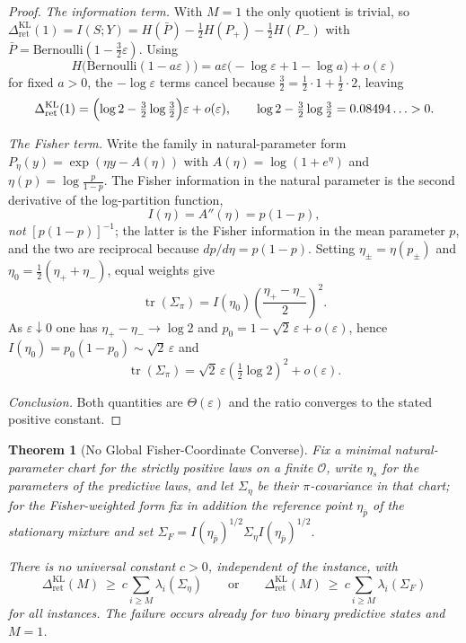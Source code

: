 \documentclass[12pt]{article}
\newtheorem{theorem}{Theorem}[section]
\theoremstyle{definition}
\DeclareMathOperator{\tr}{tr}
\newcommand{\RetKL}{\Delta_{\mathrm{ret}}^{\mathrm{KL}}}
\begin{document}
\begin{proof}
\emph{The information term.}  With $M=1$ the only quotient is trivial, so
$\RetKL(1)=I(S;Y)=H(\bar P)-\tfrac12H(P_+)-\tfrac12H(P_-)$ with
$\bar P=\mathrm{Bernoulli}(1-\tfrac32\varepsilon)$.  Using
\[
H\bigl(\mathrm{Bernoulli}(1-a\varepsilon)\bigr)
=
a\varepsilon\bigl(-\log\varepsilon+1-\log a\bigr)+o(\varepsilon)
\]
for fixed $a>0$, the $-\log\varepsilon$ terms cancel because
$\tfrac32=\tfrac12\cdot1+\tfrac12\cdot2$, leaving
\[
\RetKL(1)
=
\Bigl(\log2-\tfrac32\log\tfrac32\Bigr)\varepsilon+o(\varepsilon),
\qquad
\log2-\tfrac32\log\tfrac32=0.08494\ldots>0 .
\]

\emph{The Fisher term.}  Write the family in natural-parameter form
$P_\eta(y)=\exp(\eta y-A(\eta))$ with $A(\eta)=\log(1+e^\eta)$ and
$\eta(p)=\log\frac{p}{1-p}$.  The Fisher information in the natural parameter
is the second derivative of the log-partition function,
\[
I(\eta)=A''(\eta)=p(1-p),
\]
\emph{not} $[p(1-p)]^{-1}$; the latter is the Fisher information in the mean
parameter $p$, and the two are reciprocal because $dp/d\eta=p(1-p)$.  Setting
$\eta_\pm=\eta(p_\pm)$ and $\eta_0=\tfrac12(\eta_++\eta_-)$, equal weights give
\[
\tr(\Sigma_\pi)
=
I(\eta_0)\left(\frac{\eta_+-\eta_-}{2}\right)^{2}.
\]
As $\varepsilon\downarrow0$ one has $\eta_+-\eta_-\to\log2$ and
$p_0=1-\sqrt2\,\varepsilon+o(\varepsilon)$, hence
$I(\eta_0)=p_0(1-p_0)\sim\sqrt2\,\varepsilon$ and
\[
\tr(\Sigma_\pi)
=
\sqrt2\,\varepsilon\left(\tfrac12\log2\right)^{2}+o(\varepsilon).
\]

\emph{Conclusion.}  Both quantities are $\Theta(\varepsilon)$ and the ratio
converges to the stated positive constant.
\end{proof}

\begin{theorem}[No Global Fisher-Coordinate Converse]
\label{thm:no-global-fisher-converse}
Fix a minimal natural-parameter chart for the strictly positive laws on a
finite $\mathcal O$, write $\eta_s$ for the parameters of the predictive laws,
and let $\Sigma_\eta$ be their $\pi$-covariance in that chart; for the
Fisher-weighted form fix in addition the reference point $\eta_{\bar p}$ of the
stationary mixture and set
$\Sigma_F=I(\eta_{\bar p})^{1/2}\Sigma_\eta I(\eta_{\bar p})^{1/2}$.

There is \emph{no} universal constant $c>0$, independent of the instance, with
\[
\RetKL(M)\ \ge\ c\sum_{i\ge M}\lambda_i(\Sigma_\eta)
\qquad\text{or}\qquad
\RetKL(M)\ \ge\ c\sum_{i\ge M}\lambda_i(\Sigma_F)
\]
for all instances.  The failure occurs already for two binary predictive states
and $M=1$.
\end{theorem}
\end{document}
